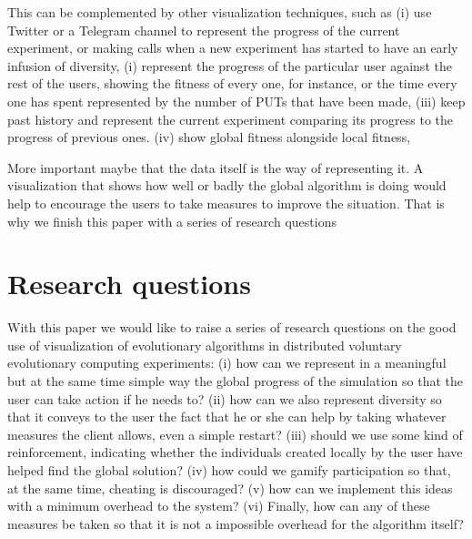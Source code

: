 \documentclass{sig-alternate}
\begin{document}
This can be complemented by other visualization techniques, such as 
(i) use Twitter or a Telegram channel to represent the progress of
  the current experiment, or making calls when a new experiment has
  started to have an early infusion of diversity, 
(i) represent the progress of the particular user against the rest
  of the users, showing the fitness of every one, for instance, or the
  time every one has spent represented by the number of PUTs that have
  been made,
(iii) keep past history and represent the current experiment comparing its
  progress to the progress of previous ones.
(iv) show global fitness alongside local fitness, 

More important maybe that the data itself is the way of representing
it. A visualization that shows how well or badly the global algorithm
is doing would help to encourage the users to take measures to improve
the situation. That is why we finish this paper with a series of
research questions

\section{Research questions}

With this paper we would like to raise a series of research questions
on the good use of visualization of evolutionary algorithms in
distributed voluntary evolutionary computing experiments:
(i) how can we represent in a meaningful but at the same time simple
  way the global progress of the simulation so that the user can take
  action if he needs to?
(ii) how can we also represent diversity so that it conveys to the
  user the fact that he or she can help by taking whatever measures
  the client allows, even a simple restart?
(iii) should we use some kind of reinforcement, indicating whether the
  individuals created locally by the user have helped find the global solution?
(iv) how could we gamify participation so that, at the same time,
  cheating is discouraged?
(v) how can we implement this ideas with a minimum overhead to the system?  
(vi) Finally, how can any of these measures be taken so that it is
  not a impossible overhead for the algorithm itself?
\end{document}
